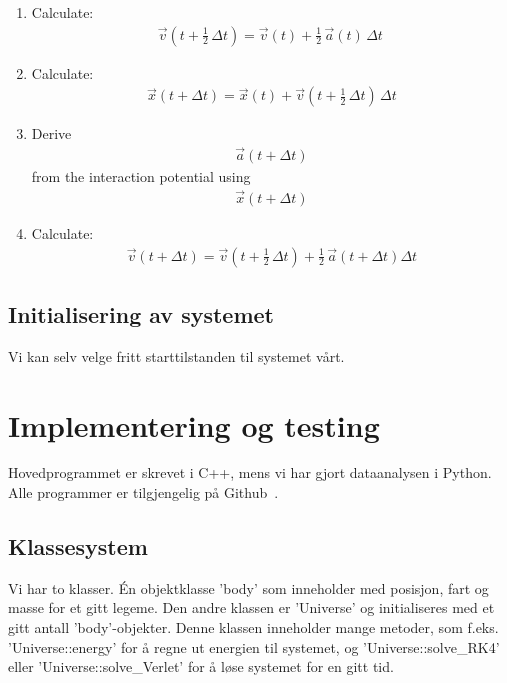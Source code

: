 \documentclass[11pt, twocolumn]{article}
\begin{document}
\begin{enumerate}
\item Calculate: \begin{align*}
\vec{v}\left(t + \tfrac12\,\Delta t\right) = \vec{v}(t) + \tfrac12\,\vec{a}(t)\,\Delta t\ 
\end{align*}


\item Calculate: \begin{align*} \vec{x}(t + \Delta t) = \vec{x}(t) + \vec{v}\left(t + \tfrac12\,\Delta t\right)\, \Delta t \end{align*}


\item Derive \begin{align*} \vec{a}(t + \Delta t) 
\end{align*} from the interaction potential using \begin{align*} \vec{x}(t + \Delta t) \end{align*}


\item Calculate: \begin{align*} \vec{v}(t + \Delta t) = \vec{v}\left(t + \tfrac12\,\Delta t\right) + \tfrac12\,\vec{a}(t + \Delta t)\Delta t \end{align*}
\end{enumerate}

\subsection{Initialisering av systemet}
Vi kan selv velge fritt starttilstanden til systemet vårt.


\section{Implementering og testing}
Hovedprogrammet er skrevet i C++, mens vi har gjort dataanalysen i Python.
Alle programmer er tilgjengelig på Github~\cite{github-repo}. 

\subsection{Klassesystem}
Vi har to klasser. Én objektklasse 'body' som inneholder med posisjon, fart 
og masse for et gitt legeme. Den andre klassen er 'Universe' og initialiseres
med et gitt antall 'body'-objekter. Denne klassen inneholder mange metoder,
som f.eks. 'Universe::energy' for å regne ut energien til systemet, og 
'Universe::solve\_RK4' eller 'Universe::solve\_Verlet' for å løse systemet
for en gitt tid.
\end{document}

